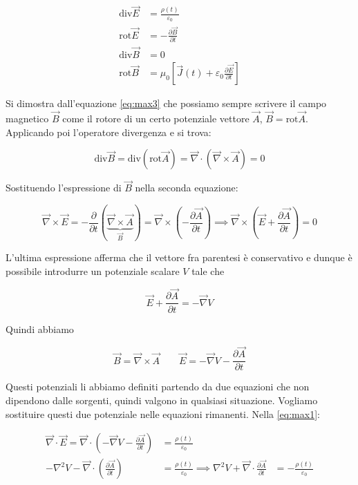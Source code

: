 \begin{align}
	\text{div}\vec{E} &=\frac{\rho (t)}{\varepsilon_0} \label{eq:max1}\\
	\text{rot}\vec{E} &= -\frac{\partial \vec{B}}{\partial t} \label{eq:max2} \\
	\text{div}\vec{B} &= 0 \label{eq:max3}\\
	\text{rot}\vec{B} &= \mu_0 \left[ \vec{J} (t) + \varepsilon_0 \frac{\partial \vec{E}}{\partial t}  \right] \label{eq:max4}
\end{align}

Si dimostra dall'equazione \eqref{eq:max3} che possiamo sempre scrivere il campo magnetico $\vec{B}$ come il rotore di un certo potenziale vettore $\vec{A}$, $ \vec{B} = \text{rot}\vec{A} $.
Applicando poi l'operatore divergenza e si trova:

\[
	\text{div}\vec{B} = \text{div}(\text{rot}\vec{A} ) = \vec{\nabla} \cdot (\vec{\nabla} \times \vec{A} ) = 0
\]

Sostituendo l'espressione di $\vec{B}$ nella seconda equazione:

\[
	\vec{\nabla} \times \vec{E} = -\frac{\partial}{\partial t}(\underbrace{\vec{\nabla} \times \vec{A}}_{\vec{B}} ) = \vec{\nabla} \times \left( -\frac{\partial \vec{A}}{\partial t}  \right) \implies \vec{\nabla} \times \left( \vec{E} +\frac{\partial \vec{A}}{\partial t}  \right) =0
\]

L'ultima espressione afferma che il vettore fra parentesi è conservativo e dunque è possibile introdurre un potenziale scalare $V$ tale che

\[
	\vec{E} +\frac{\partial \vec{A}}{\partial t} = - \vec{\nabla} V
\]

Quindi abbiamo

\[
	\boxed{\vec{B} = \vec{\nabla} \times \vec{A} \qquad \vec{E} =-\vec{\nabla} V-\frac{\partial \vec{A}}{\partial t}}
\]

Questi potenziali li abbiamo definiti partendo da due equazioni che non dipendono dalle sorgenti, quindi valgono in qualsiasi situazione. Vogliamo sostituire questi due potenziale nelle equazioni rimanenti. Nella \eqref{eq:max1}:

\begin{equation*}
	\begin{aligned}
		\vec{\nabla} \cdot \vec{E} =\vec{\nabla} \cdot \left( -\vec{\nabla} V-\frac{\partial \vec{A}}{\partial t}  \right) &= \frac{\rho (t)}{\varepsilon_0} \\
		- \nabla^2 V - \vec{\nabla} \cdot \left( \frac{\partial \vec{A}}{\partial t}  \right) &= \frac{\rho (t)}{\varepsilon_0} \implies
		\nabla^2 V + \vec{\nabla} \cdot \frac{\partial \vec{A}}{\partial t} &= -\frac{\rho (t)}{\varepsilon_0}
	\end{aligned}
\end{equation*}

